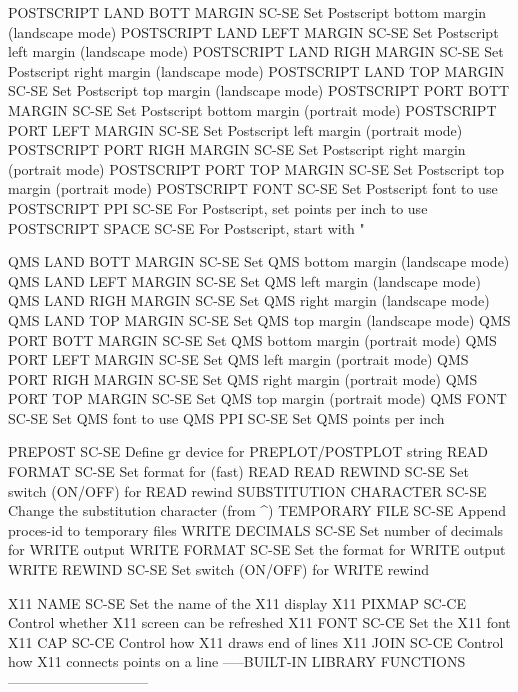 POSTSCRIPT LAND BOTT MARGIN SC-SE Set Postscript bottom margin (landscape mode)
POSTSCRIPT LAND LEFT MARGIN SC-SE Set Postscript left margin (landscape mode)
POSTSCRIPT LAND RIGH MARGIN SC-SE Set Postscript right margin (landscape mode)
POSTSCRIPT LAND TOP  MARGIN SC-SE Set Postscript top margin (landscape mode)
POSTSCRIPT PORT BOTT MARGIN SC-SE Set Postscript bottom margin (portrait mode)
POSTSCRIPT PORT LEFT MARGIN SC-SE Set Postscript left margin (portrait mode)
POSTSCRIPT PORT RIGH MARGIN SC-SE Set Postscript right margin (portrait mode)
POSTSCRIPT PORT TOP  MARGIN SC-SE Set Postscript top margin (portrait mode)
POSTSCRIPT FONT             SC-SE Set Postscript font to use
POSTSCRIPT PPI              SC-SE For Postscript, set points per inch to use
POSTSCRIPT SPACE            SC-SE For Postscript, start with "%

QMS LAND BOTT MARGIN        SC-SE Set QMS bottom margin (landscape mode)
QMS LAND LEFT MARGIN        SC-SE Set QMS left margin (landscape mode)
QMS LAND RIGH MARGIN        SC-SE Set QMS right margin (landscape mode)
QMS LAND TOP  MARGIN        SC-SE Set QMS top margin (landscape mode)
QMS PORT BOTT MARGIN        SC-SE Set QMS bottom margin (portrait mode)
QMS PORT LEFT MARGIN        SC-SE Set QMS left margin (portrait mode)
QMS PORT RIGH MARGIN        SC-SE Set QMS right margin (portrait mode)
QMS PORT TOP  MARGIN        SC-SE Set QMS top margin (portrait mode)
QMS FONT                    SC-SE Set QMS font to use
QMS PPI                     SC-SE Set QMS points per inch

PREPOST                     SC-SE Define gr device for PREPLOT/POSTPLOT string
READ FORMAT                 SC-SE Set format for (fast) READ
READ REWIND                 SC-SE Set switch (ON/OFF) for READ rewind
SUBSTITUTION CHARACTER      SC-SE Change the substitution character (from ^)
TEMPORARY FILE              SC-SE Append proces-id to temporary files
WRITE DECIMALS              SC-SE Set number of decimals for WRITE output
WRITE FORMAT                SC-SE Set the format for WRITE output
WRITE REWIND                SC-SE Set switch (ON/OFF) for WRITE rewind

X11 NAME                    SC-SE Set the name of the X11 display 
X11 PIXMAP                  SC-CE Control whether X11 screen can be refreshed
X11 FONT                    SC-CE Set the X11 font
X11 CAP                     SC-CE Control how X11 draws end of lines
X11 JOIN                    SC-CE Control how X11 connects points on a line
-----BUILT-IN LIBRARY FUNCTIONS------------------------------


